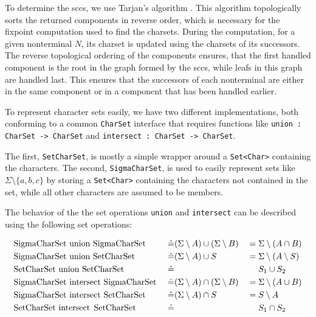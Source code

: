 To determine the \acp{scc}, we use Tarjan's algorithm \cite{tarjan}. This algorithm topologically sorts the returned components in reverse order, which is necessary for the fixpoint computation used to find the charsets.
During the computation, for a given nonterminal $N$, its charset is updated using the charsets of its successors. The reverse topological ordering of the components ensures, that the first handled component is the root in the graph formed by the \acp{scc}, while leafs in this graph are handled last. This ensures that the successors of each nonterminal are either in the same component or in a component that has been handled earlier.

To represent character sets easily, we have two different implementations, both conforming to a common \lstinline|CharSet| interface that requires functions like \lstinline|union : CharSet -> CharSet| and \lstinline|intersect : CharSet -> CharSet|.

The first, \lstinline|SetCharSet|, is mostly a simple wrapper around a \lstinline|Set<Char>| containing the characters.
The second, \lstinline|SigmaCharSet|, is used to easily represent sets like $\Sigma \setminus \{a, b, c\}$ by storing a \lstinline|Set<Char>| containing the characters not contained in the set, while all other characters are assumed to be members.

The behavior of the the set operations \lstinline|union| and \lstinline|intersect| can be described using the following set operations:

\noindent
\begin{alignat*}{3}
	& \text{\lstinline|SigmaCharSet union SigmaCharSet| } && \hat{=} (\Sigma \setminus A) \cup (\Sigma \setminus B) & &= \Sigma \setminus (A \cap B) \\
	& \text{\lstinline|SigmaCharSet union SetCharSet| } && \hat{=} (\Sigma \setminus A) \cup S & &= \Sigma \setminus (A \setminus S) \\
	& \text{\lstinline|SetCharSet union SetCharSet| } && \hat{=} & &\phantom{{}={}} S_1 \cup S_2 \\
	& \text{\lstinline|SigmaCharSet intersect SigmaCharSet| } && \hat{=} (\Sigma \setminus A) \cap (\Sigma \setminus B) & &= \Sigma \setminus (A \cup B) \\
	& \text{\lstinline|SigmaCharSet intersect SetCharSet| } && \hat{=} (\Sigma \setminus A) \cap S & &= S \setminus A \\
	& \text{\lstinline|SetCharSet intersect SetCharSet| } && \hat{=} & &\phantom{{}={}} S_1 \cap S_2
\end{alignat*}

